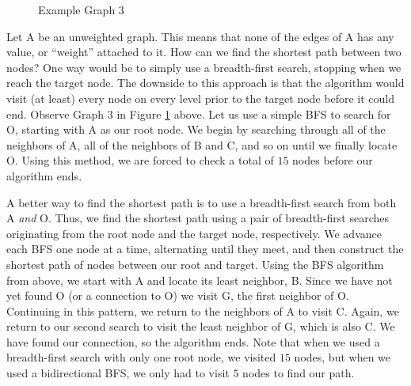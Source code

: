 \begin{figure}
\centering
{}
\caption{Example Graph 3}
\label{Bidirectional}
\end{figure}

Let A be an unweighted graph. This means that none of the edges of A has any value, or ``weight'' attached to it. How can we find the shortest path between two nodes?
One way would be to simply use a breadth-first search, stopping when we reach the
target node. The downside to this approach is that the algorithm would visit (at least)
every node on every level prior to the target node before it could end. Observe Graph 3 in Figure \ref{Bidirectional} above.
Let us use a simple BFS to search for O, starting with A as our root node.
We begin by searching through all of the neighbors of A, all of the neighbors of B
and C, and so on until we finally locate O. Using this method, we are forced to check
a total of $15$ nodes before our algorithm ends.

A better way to find the shortest path is to use a breadth-first search from
both A \emph{and} O. Thus, we find the shortest path using a pair of breadth-first searches originating from the root node and the target node, respectively.
We advance each BFS one node at a time, alternating until they meet, and then
construct the shortest path of nodes between our root and target.
Using the BFS algorithm from above, we start with A and locate its
least neighbor, B. Since we have not yet found O (or a connection to O) we visit G,
the first neighbor of O. Continuing in this pattern, we return to the neighbors
of A to visit C. Again, we return to our second search to visit the least neighbor of
G, which is also C. We have found our connection, so the algorithm ends. Note that when we used a breadth-first
search with only one root node, we visited $15$ nodes, but when we used a bidirectional BFS, we only had to visit $5$ nodes to find our path.

